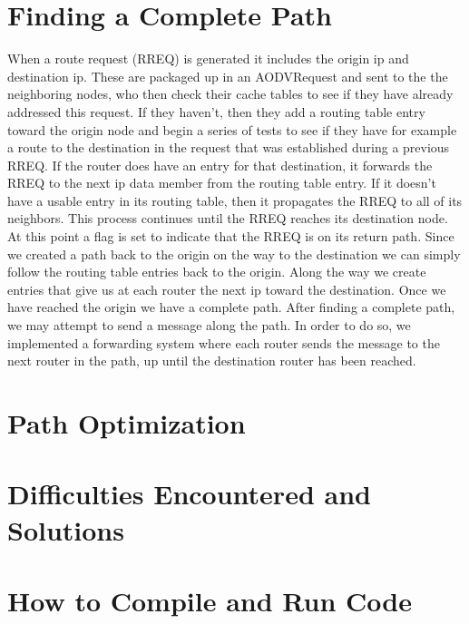 \documentclass[12pt, titlepage]{article}
\begin{document}
\section{Finding a Complete Path}
When a route request (RREQ) is generated it includes the origin ip and destination ip.  These are packaged up in an AODVRequest and sent to the the neighboring nodes, who then check their cache tables to see if they have already addressed this request.  If they haven't, then they add a routing table entry toward the origin node and begin a series of tests to see if they have for example a route to the destination in the request that was established during a previous RREQ.  If the router does have an entry for that destination, it forwards the RREQ to the next ip data member from the routing table entry.  If it doesn't have a usable entry in its routing table, then it propagates the RREQ to all of its neighbors.  This process continues until the RREQ reaches its destination node.  At this point a flag is set to indicate that the RREQ is on its return path.  Since we created a path back to the origin on the way to the destination we can simply follow the routing table entries back to the origin.  Along the way we create entries that give us at each router the next ip toward the destination.  Once we have reached the origin we have a complete path.
After finding a complete path, we may attempt to send a message along the path. In order to do so, we implemented a forwarding system
where each router sends the message to the next router in the path, up until the destination router has been reached. 

\section{Path Optimization}


\section{Difficulties Encountered and Solutions}



\section{How to Compile and Run Code}
\end{document}
